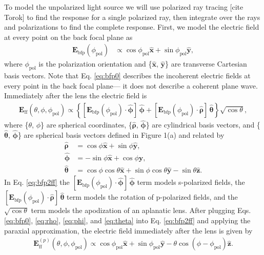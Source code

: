 \documentclass{osa-article}
\providecommand{\mb}[1]{\mathbf{#1}}
\providecommand{\mh}[1]{\mathbf{\hat{#1}}}
\providecommand{\bsh}[1]{\hat{\boldsymbol{#1}}}
\begin{document}
To model the unpolarized light source we will use polarized ray tracing [cite
Torok] to find the response for a single polarized ray, then integrate over the
rays and polarizations to find the complete response. First, we model the
electric field at every point on the back focal plane as
\begin{align}
   \mb{E}_{\text{bfp}}(\phi_{\text{pol}}) &\propto \cos\phi_{\text{pol}}\mh{x} + \sin\phi_{\text{pol}}\mh{y}, \label{eq:bfp0}
\end{align}
where $\phi_{\text{pol}}$ is the polarization orientation and \{$\mh{x}$,
$\mh{y}$\} are transverse Cartesian basis vectors. Note that Eq. \ref{eq:bfp0}
describes the incoherent electric fields at every point in the back focal
plane--- it does not describe a coherent plane wave. Immediately after the lens
the electric field is
\begin{align}
  \mb{E}_{\text{ff}}(\theta, \phi, \phi_{\text{pol}}) \propto \left\{[\mb{E}_\text{bfp}(\phi_{\text{pol}})\cdot\bsh{\phi}]\,\bsh{\phi} + [\mb{E}_\text{bfp}(\phi_{\text{pol}})\cdot\bsh{\rho}]\,\bsh{\theta}\right\}\sqrt{\cos\theta}, \label{eq:bfp2ff}
\end{align}
where \{$\theta$, $\phi$\} are spherical coordinates, \{$\bsh{\rho}$,
$\bsh{\phi}$\} are cylindrical basis vectors, and \{$\bsh{\theta}$,
$\bsh{\phi}$\} are spherical basis vectors defined in Figure 1(a) and related by
\begin{align}
  \bsh{\rho} &= \cos\phi\mh{x} + \sin\phi\mh{y},\label{eq:rho}\\
  \bsh{\phi} &= -\sin\phi\mh{x} + \cos\phi\mh{y},\label{eq:phi}\\
  \bsh{\theta} &= \cos\phi\cos\theta\mh{x} + \sin\phi\cos\theta\mh{y} - \sin\theta\mh{z}.\label{eq:theta}               
\end{align}
In Eq. \ref{eq:bfp2ff} the
$[\mb{E}_\text{bfp}(\phi_{\text{pol}})\cdot\bsh{\phi}]\,\bsh{\phi}$ term models
s-polarized fields, the
$[\mb{E}_\text{bfp}(\phi_{\text{pol}})\cdot\bsh{\rho}]\,\bsh{\theta}$ term
models the rotation of p-polarized fields, and the $\sqrt{\cos\theta}$ term
models the apodization of an aplanatic lens. After plugging Eqs. \ref{eq:bfp0}, \ref{eq:rho}, \ref{eq:phi}, and \ref{eq:theta} into Eq. \ref{eq:bfp2ff} and applying the
paraxial approximation, the electric field immediately after the lens is given
by
\begin{align}
  \mb{E}_{\text{ff}}^{(p)}(\theta, \phi, \phi_{\text{pol}}) \propto \cos\phi_{\text{pol}}\mh{x} + \sin\phi_{\text{pol}}\mh{y} - \theta\cos(\phi - \phi_{\text{pol}})\mh{z}.\label{eq:eff}
\end{align}
\end{document}
